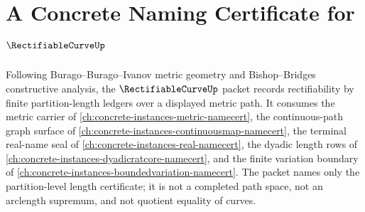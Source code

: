 \chapter{A Concrete Naming Certificate for $\RectifiableCurveUp$}
\label{ch:concrete-instances-rectifiable-curve-namecert}

Following Burago--Burago--Ivanov metric geometry and Bishop--Bridges constructive analysis, the $\RectifiableCurveUp$ packet records rectifiability by finite partition-length ledgers over a displayed metric path. It consumes the metric carrier of \autoref{ch:concrete-instances-metric-namecert}, the continuous-path graph surface of \autoref{ch:concrete-instances-continuousmap-namecert}, the terminal real-name seal of \autoref{ch:concrete-instances-real-namecert}, the dyadic length rows of \autoref{ch:concrete-instances-dyadicratcore-namecert}, and the finite variation boundary of \autoref{ch:concrete-instances-boundedvariation-namecert}. The packet names only the partition-level length certificate; it is not a completed path space, not an arclength supremum, and not quotient equality of curves.

